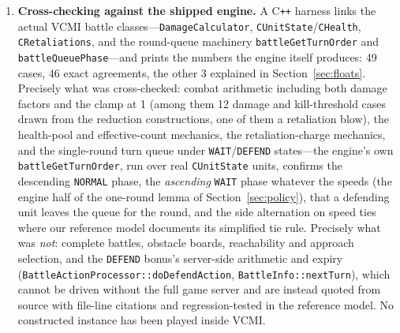 \documentclass[11pt,a4paper]{article}
\theoremstyle{plain}
\theoremstyle{definition}
\theoremstyle{plain}
\theoremstyle{definition}
\theoremstyle{remark}
\newcommand{\src}[1]{\texttt{#1}}
\begin{document}
\begin{enumerate}
  \texttt{DEFEND} bonus live in the damage formula, including the published \src{def 27}
  constants. One scope note, so this is not overread: since every non-waiting blow lands
  before any postponed \texttt{DEFEND} (Section~\ref{sec:policy}) and the searched player
  never waits, no blow in these runs strikes a target that is already defending
  (instrumenting the damage calls in review round 13 recorded zero such calls---a
  measurement of record, not an invariant the battery asserts); what the $(\ddagger)$ runs
  certify is the phase machinery and that every answer is invariant under it, while the
  capped defended branch itself is exercised by the mechanics tests and by a phase-ordered
  trace in the regression battery. ``Every play'' without qualification would overstate all
  of this; which tiers are exhaustive over what, and on how many instances, is itemized in
  the artifact's \src{README.md}.
\item \textbf{Cross-checking against the shipped engine.} A C\texttt{++} harness links the
  actual VCMI battle classes---\src{DamageCalculator}, \src{CUnitState}/\src{CHealth},
  \src{CRetaliations}, and the round-queue machinery \src{battleGetTurnOrder} and
  \src{battleQueuePhase}---and prints the numbers the engine itself produces: 49 cases, 46
  exact agreements, the other 3 explained in Section~\ref{sec:floats}. Precisely what was
  cross-checked: combat arithmetic including both damage factors and the clamp at 1 (among
  them 12 damage and kill-threshold cases drawn from the reduction constructions, one of them
  a retaliation blow), the health-pool and effective-count mechanics, the retaliation-charge
  mechanics, and the single-round turn queue under
  \texttt{WAIT}/\texttt{DEFEND} states---the engine's own \src{battleGetTurnOrder}, run over
  real \src{CUnitState} units, confirms the descending \texttt{NORMAL} phase, the
  \emph{ascending} \texttt{WAIT} phase whatever the speeds (the engine half of the one-round
  lemma of Section~\ref{sec:policy}), that a defending unit leaves the queue for the round,
  and the side alternation on speed ties where our reference model documents its simplified
  tie rule. Precisely what was \emph{not}: complete battles, obstacle boards, reachability
  and approach selection, and the \texttt{DEFEND} bonus's server-side arithmetic and expiry
  (\src{BattleActionProcessor::\allowbreak doDefendAction}, \src{BattleInfo::\allowbreak nextTurn}),
  which cannot be driven without the full game server and are instead quoted from source
  with file-line citations and regression-tested in the reference model. No constructed
  instance has been played inside VCMI.
\end{enumerate}
\end{document}

